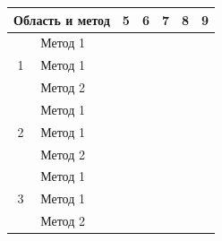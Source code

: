 \documentclass[a4paper, 12pt]{article}
\begin{document}
\begin{table}[h]\begin{center}  \begin{tabular}[t]{|c|l|c|c|c|c|c|}\hline
    \multicolumn{2}{|c|}{Область и метод} & 5 & 6 & 7 & 8&9 \\ \hline
    \multirow{3}{*}{1}      
    & Метод 1     &   &   &   &  & \\ \cline{2-7} 
                            & Метод 1     &   &   &   &  & \\ \cline{2-7} 
                            & Метод 2     &   &   &   &   &\\ \hline
    \multirow{3}{*}{2}     
     & Метод 1     &   &   &   &  & \\ \cline{2-7} 
                            & Метод 1     &   &   &   &  & \\ \cline{2-7} 
                            & Метод 2     &   &   &   &  & \\ \hline
    \multirow{3}{*}{3}      
    & Метод 1     &   &   &   &  & \\ \cline{2-7} 
                            & Метод 1     &   &   &   &  & \\ \cline{2-7} 
                            & Метод 2     &   &   &   &  & \\ \hline
    \end{tabular}\end{center}\end{table}    
    
\end{document}
